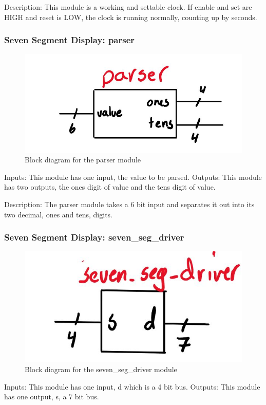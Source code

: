 \documentclass[a4paper]{article}
\begin{document}
Description: This module is a working and settable clock. If enable and set are HIGH and reset is LOW, the clock is running normally, counting up by seconds.

\subsubsection{Seven Segment Display: parser}
\begin{figure}[H]
    \includegraphics[width=0.8 \linewidth]{images/parser.JPG}
    \caption{Block diagram for the parser module}
    \label{parser}
\end{figure}

Inputs: This module has one input, the value to be parsed.
Outputs: This module has two outputs, the ones digit of value and the tens digit of value.

Description: The parser module takes a 6 bit input and separates it out into its two decimal, ones and tens, digits.

\subsubsection{Seven Segment Display: seven_seg_driver}
\begin{figure}[H]
    \includegraphics[width=0.8 \linewidth]{images/seven_seg_driver.JPG}
    \caption{Block diagram for the seven_seg_driver module}
    \label{seven_swg_driver}
\end{figure}

Inputs: This module has one input, d which is a 4 bit bus.
Outputs: This module has one output, s, a 7 bit bus.
\end{document}
